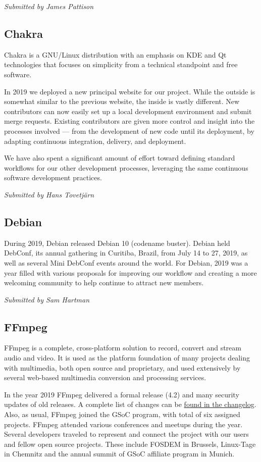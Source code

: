 \documentclass[a4paper]{report}
\begin{document}
{\em Submitted by James Pattison}

\subsection{Chakra}

Chakra is a GNU/Linux distribution with an emphasis on KDE and Qt
technologies that focuses on simplicity from a technical standpoint and
free software.

In 2019 we deployed a new principal website for our project. While the
outside is somewhat similar to the previous website, the inside is
vastly different. New contributors can now easily set up a local
development environment and submit merge requests.  Existing
contributors are given more control and insight into the processes
involved --- from the development of new code until its deployment, by
adapting continuous integration, delivery, and deployment.

We have also spent a significant amount of effort toward defining
standard workflows for our other development processes, leveraging the
same continuous software development practices.

{\em Submitted by Hans Tovetjärn}

\subsection{Debian}

During 2019, Debian released Debian 10 (codename buster).  Debian held
DebConf, its annual gathering in Curitiba, Brazil, from July 14 to 27,
2019, as well as several Mini DebConf events around the world.  For
Debian, 2019 was a year filled with various proposals for improving our
workflow and creating a more welcoming community to help continue to
attract new members.

{\em Submitted by Sam Hartman}

\subsection{FFmpeg}

FFmpeg is a complete, cross-platform solution to record, convert and
stream audio and video. It is used as the platform foundation of many
projects dealing with multimedia, both open source and proprietary, and
used extensively by several web-based multimedia conversion and
processing services.

In the year 2019 FFmpeg delivered a formal release (4.2) and many
security updates of old releases. A complete list of changes can be
\href{https://git.ffmpeg.org/gitweb/ffmpeg.git/blob/HEAD:/Changelog}{found
in the changelog}.  Also, as usual, FFmpeg joined the GSoC program, with
total of six assigned projects.  FFmpeg attended various conferences and
meetups during the year. Several developers traveled to represent and
connect the project with our users and fellow open source projects.
These include FOSDEM in Brussels, Linux-Tage in Chemnitz and the annual
summit of GSoC affiliate program in Munich.
\end{document}
